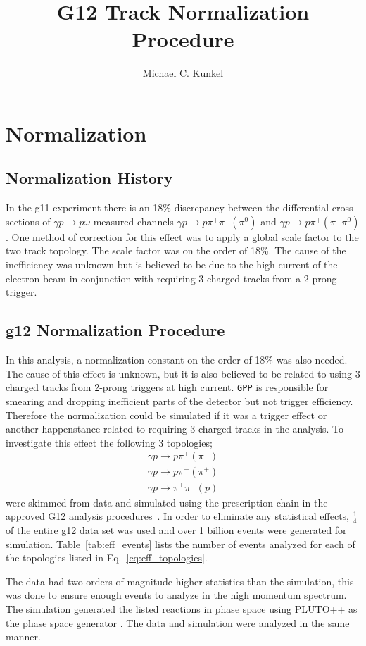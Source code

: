 \documentclass[11pt,a4paper]{article}
\author{Michael C. Kunkel}
\title{G12 Track Normalization Procedure}
\newcommand{\abbr}[1]{\textsc{\texttt{#1}}}
\def\tables{/Users/michaelkunkel/WORK/GIT_HUB/Pi0_Papers/ANALYSIS_NOTE/tables}
\begin{document}
\maketitle
\section{Normalization}\label{sec:results.normalization}
\subsection{Normalization History}
In the g11 experiment there is an 18\% discrepancy between the differential cross-sections of $\gamma p \rightarrow p \omega$ measured channels $\gamma p \rightarrow p \pi^+ \pi^- (\pi^0)$ and $\gamma p \rightarrow p \pi^+ (\pi^- \pi^0)$. One method of correction for this effect was to apply a global scale factor to the two track topology. The scale factor was on the order of 18\%. The cause of the inefficiency was unknown but is believed to be due to the high current of the electron beam in conjunction with requiring 3 charged tracks from a 2-prong trigger.
\subsection{g12 Normalization Procedure}\label{sec:results.g12normalization}
In this analysis, a normalization constant on the order of 18\% was also needed. The cause of this effect is unknown, but it is also believed to be related to using 3 charged tracks from 2-prong triggers at high current. \abbr{GPP} is responsible for smearing and dropping inefficient parts of the detector but not trigger efficiency. Therefore the normalization could be simulated if it was a trigger effect or another happenstance related to requiring 3 charged tracks in the analysis. To investigate this effect the following 3 topologies;
\begin{align}\label{eq:eff_topologies}
  \gamma p \rightarrow p \pi^+ (\pi^-) \nonumber  \\
  \gamma p \rightarrow p \pi^- (\pi^+)  \nonumber \\
  \gamma p \rightarrow \pi^+ \pi^- (p)
\end{align}
were skimmed from data and simulated using the prescription chain in the approved G12 analysis procedures~\cite{g12note}. In order to eliminate any statistical effects, $\frac{1}{4}$ of the entire g12 data set was used and over 1 billion events were generated for simulation. Table~\ref{tab:eff_events} lists the number of events analyzed for each of the topologies listed in Eq.~\ref{eq:eff_topologies}.

The data had two orders of magnitude higher statistics than the simulation, this was done to ensure enough events to analyze in the high momentum spectrum. The simulation generated the listed reactions in phase space using PLUTO++ as the phase space generator . The data and simulation were analyzed in the same manner.
\end{document}
